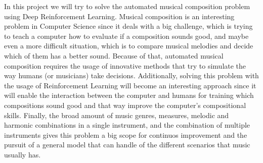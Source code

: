 In this project we will try to solve the automated musical composition problem using Deep Reinforcement Learning. Musical composition is an interesting problem in Computer Science since it deals with a big challenge, which is trying to teach a computer how to evaluate if a composition sounds good, and maybe even a more difficult situation, which is to compare musical melodies and decide which of them has a better sound. Because of that, automated musical composition requires the usage of innovative methods that try to simulate the way humans (or musicians) take decisions. Additionally, solving this problem with the usage of Reinforcement Learning will become an interesting approach since it will enable the interaction between the computer and humans for training which compositions sound good and that way improve the computer's compositional skills. Finally, the broad amount of music genres, measures, melodic and harmonic combinations in a single instrument, and the combination of multiple instruments gives this problem a big scope for continuos improvement and the pursuit of a general model that can handle of the different scenarios that music usually has.